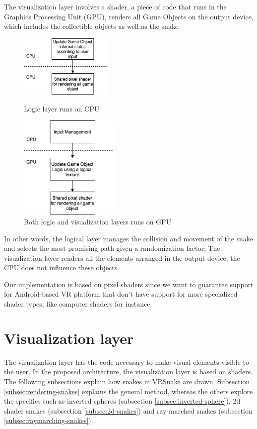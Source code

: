 \documentclass[runningheads]{llncs}
\begin{document}
The visualization layer involves a shader, a piece of code that runs in the Graphics Processing Unit (GPU), renders all Game Objects on the output device, which includes the collectible objects as well as the snake.

\begin{figure}
    \centering
    \begin{minipage}[b][6cm][b]{.5\textwidth}
        \centering
        \includegraphics[height=3cm]{hci2020-paper/images/VRSnake_Proposed_Architecture.png}
        \caption{Logic layer runs on CPU}
        \label{fig:coupledModel}
    \end{minipage}%
    \begin{minipage}[b][6cm][b]{.5\textwidth}
        \centering
        \includegraphics[height=5cm]{hci2020-paper/images/VRSnake_Proposed_Architecture2.png}
        \caption{Both logic and visualization layers runs on GPU}
        \label{fig:uncoupledModel}
    \end{minipage}
\end{figure}

In other words, the logical layer manages the collision and movement of the snake and selects the most promising path given a randomization factor; The visualization layer renders all the elements arranged in the output device, the CPU does not influence these objects.

Our implementation is based on pixel shaders since we want to guarantee support for Android-based VR platform that don't have support for more specialized shader types, like computer shaders for instance.

\section{Visualization layer}
\label{sec:visualization-layer}
The visualization layer has the code necessary to make visual elements visible to the user. In the proposed architecture, the visualization layer is based on shaders. The following subsections explain how snakes in VRSnake are drawn. Subsection \ref{subsec:rendering-snakes} explains the general method, whereas the others explore the specifics such as inverted spheres (subsection \ref{subsec:inverted-sphere}), 2d shader snakes (subsection \ref{subsec:2d-snakes}) and ray-marched snakes (subsection \ref{subsec:raymarching-snakes}).
\end{document}
